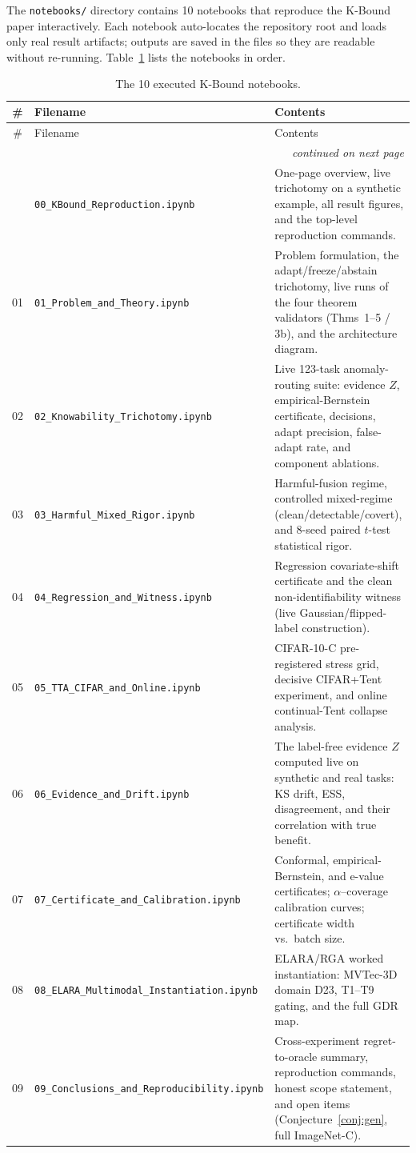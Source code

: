 The \texttt{notebooks/} directory contains 10 notebooks that reproduce the
K-Bound paper interactively.  Each notebook auto-locates the repository root and
loads only real result artifacts; outputs are saved in the files so they are
readable without re-running.  Table~\ref{tab:app-notebooks} lists the notebooks
in order.

\begin{longtable}{clp{9.5cm}}
\caption{The 10 executed K-Bound notebooks.}
\label{tab:app-notebooks}\\
\toprule
\# & Filename & Contents \\
\midrule
\endfirsthead
\toprule
\# & Filename & Contents \\
\midrule
\endhead
\midrule
\multicolumn{3}{r}{\textit{continued on next page}}\\
\endfoot
\bottomrule
\endlastfoot
00 & \texttt{00\_KBound\_Reproduction.ipynb} &
  One-page overview, live trichotomy on a synthetic example, all result
  figures, and the top-level reproduction commands. \\
01 & \texttt{01\_Problem\_and\_Theory.ipynb} &
  Problem formulation, the adapt/freeze/abstain trichotomy, live runs of
  the four theorem validators (Thms~1--5 / 3b), and the architecture
  diagram. \\
02 & \texttt{02\_Knowability\_Trichotomy.ipynb} &
  Live 123-task anomaly-routing suite: evidence $Z$, empirical-Bernstein
  certificate, decisions, adapt precision, false-adapt rate, and
  component ablations. \\
03 & \texttt{03\_Harmful\_Mixed\_Rigor.ipynb} &
  Harmful-fusion regime, controlled mixed-regime (clean/detectable/covert),
  and 8-seed paired $t$-test statistical rigor. \\
04 & \texttt{04\_Regression\_and\_Witness.ipynb} &
  Regression covariate-shift certificate and the clean non-identifiability
  witness (live Gaussian/flipped-label construction). \\
05 & \texttt{05\_TTA\_CIFAR\_and\_Online.ipynb} &
  CIFAR-10-C pre-registered stress grid, decisive CIFAR+Tent experiment,
  and online continual-Tent collapse analysis. \\
06 & \texttt{06\_Evidence\_and\_Drift.ipynb} &
  The label-free evidence $Z$ computed live on synthetic and real tasks:
  KS drift, ESS, disagreement, and their correlation with true benefit. \\
07 & \texttt{07\_Certificate\_and\_Calibration.ipynb} &
  Conformal, empirical-Bernstein, and e-value certificates; $\alpha$--coverage
  calibration curves; certificate width vs.\ batch size. \\
08 & \texttt{08\_ELARA\_Multimodal\_Instantiation.ipynb} &
  ELARA/RGA worked instantiation: MVTec-3D domain D23, T1--T9 gating, and
  the full GDR map. \\
09 & \texttt{09\_Conclusions\_and\_Reproducibility.ipynb} &
  Cross-experiment regret-to-oracle summary, reproduction commands, honest
  scope statement, and open items (Conjecture~\ref{conj:gen}, full
  ImageNet-C). \\
\end{longtable}

